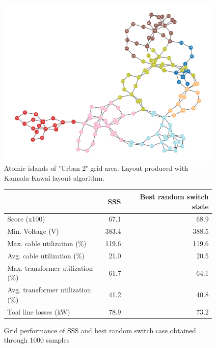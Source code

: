 \begin{figure}[H]
    \begin{center}
        \includegraphics[width=.8\linewidth]{img/switchstate_exploring/urban2/topology_sss_patched.png}
    \end{center}
    \caption{
        Atomic islands of "Urban 2" grid area. Layout produced with
        Kamada-Kawai layout algorithm\autocite{kamada_kawai}.
    }
    \label{fig:appendix:urban2:topology_patched}
  \end{figure}

  \begin{figure}[H]
    \centering
    \begin{tabular}{lrr}
      \toprule
      & SSS & Best random switch state \\
      \midrule
      Score (x100) & 67.1 & 68.9 \\
      Min. Voltage (V) & 383.4 & 388.5 \\
      Max. cable utilization (\%) & 119.6 & 119.6 \\
      Avg. cable utilization (\%) & 21.0 & 20.5 \\
      Max. transformer utilization (\%) & 61.7 & 64.1 \\
      Avg. transformer utilization (\%) & 41.2 & 40.8 \\
      Toal line losses (kW) & 78.9 & 73.2 \\
      \bottomrule
    \end{tabular}
    \caption{
      Grid performance of SSS and best random switch case obtained
      through 1000 samples
    }
    \label{fig:result:urban2:table}
  \end{figure}
  
